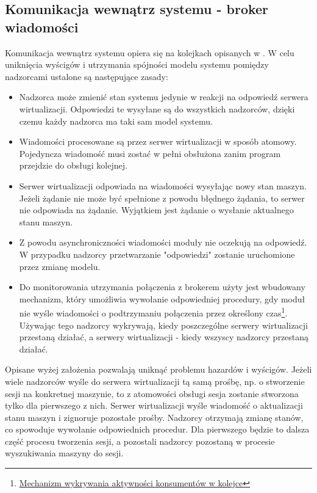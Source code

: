 \documentclass[../deliverable-two.tex]{subfiles}
\begin{document}
\subsection{Komunikacja wewnątrz systemu - broker wiadomości}
\label{communication:broker}

Komunikacja wewnątrz systemu opiera się na kolejkach opisanych w . W celu uniknięcia wyścigów i utrzymania spójności modelu systemu pomiędzy nadzorcami ustalone są następujące zasady:
\begin{itemize}
    \item Nadzorca może zmienić stan systemu jedynie w reakcji na odpowiedź serwera wirtualizacji. Odpowiedzi te wysyłane są do wszystkich nadzorców, dzięki czemu każdy nadzorca ma taki sam model systemu.
    \item Wiadomości procesowane są przez serwer wirtualizacji w sposób atomowy. Pojedyncza wiadomość musi zostać w pełni obsłużona zanim program przejdzie do obsługi kolejnej.
    \item Serwer wirtualizacji odpowiada na wiadomości wysyłając nowy stan maszyn. Jeżeli żądanie nie może być spełnione z powodu błędnego żądania, to serwer nie odpowiada na żądanie. Wyjątkiem jest żądanie o wysłanie aktualnego stanu maszyn.
    \item Z powodu asynchroniczności wiadomości moduły nie oczekują na odpowiedź. W przypadku nadzorcy przetwarzanie "odpowiedzi" zostanie uruchomione przez zmianę modelu.
    \item Do monitorowania utrzymania połączenia z brokerem użyty jest wbudowany mechanizm, który umożliwia wywołanie odpowiedniej procedury, gdy moduł nie wyśle wiadomości o podtrzymaniu połączenia przez określony czas\footnote{\href{https://www.rabbitmq.com/consumers.html\#active-consumer}{Mechanizm wykrywania aktywności konsumentów w kolejce}}. Używając tego nadzorcy wykrywają, kiedy poszczególne serwery wirtualizacji przestaną działać, a serwery wirtualizacji - kiedy wszyscy nadzorcy przestaną działać.
\end{itemize}

Opisane wyżej założenia pozwalają uniknąć problemu hazardów i wyścigów. Jeżeli wiele nadzorców wyśle do serwera wirtualizacji tą samą prośbę, np. o stworzenie sesji na konkretnej maszynie, to z atomowości obsługi sesja zostanie stworzona tylko dla pierwszego z nich. Serwer wirtualizacji wyśle wiadomość o aktualizacji stanu maszyn i zignoruje pozostałe prośby. Nadzorcy otrzymają zmianę stanów, co spowoduje wywołanie odpowiednich procedur. Dla pierwszego będzie to dalsza część procesu tworzenia sesji, a pozostali nadzorcy pozostaną w procesie wyszukiwania maszyny do sesji.
\end{document}
